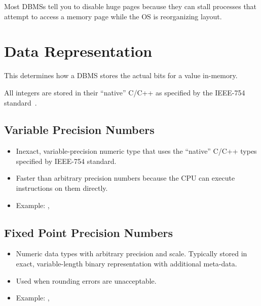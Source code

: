 \documentclass[11pt]{article}
\begin{document}
Most DBMSs tell you to disable huge pages because they can stall processes that attempt to access 
a memory page while the OS is reorganizing layout.

\section{Data Representation}
This determines how a DBMS stores the actual bits for a value in-memory.

All integers are stored in their ``native'' C/C++ as specified by the IEEE-754 
standard~\cite{ieee754}.

\subsection*{Variable Precision Numbers}
\begin{itemize}
    \item
    Inexact, variable-precision numeric type that uses the ``native'' C/C++ types specified by 
    IEEE-754 standard.
    
    \item
    Faster than arbitrary precision numbers because the CPU can execute instructions on them 
    directly.
    
    \item
    Example: , 
\end{itemize}

\subsection*{Fixed Point Precision Numbers}
\begin{itemize}
    \item
    Numeric data types with arbitrary precision and scale.
    Typically stored in exact, variable-length binary representation with additional meta-data.
    
    \item
    Used when rounding errors are unacceptable.
    
    \item Example: , 
\end{itemize}
\end{document}
